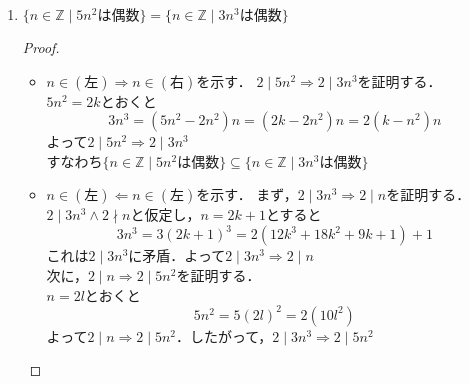 \documentclass[a4paper,12pt]{ltjsarticle}
\newcommand{\Z}{\mathbb{Z}}
\begin{document}
\begin{enumerate}[(1)]
\begin{proof}
\begin{itemize}
\begin{gather*}
                    \end{gather*}
                    両辺を$x^2$で割って
                    \begin{equation*}
                        x + \frac{1}{x} < 2
                    \end{equation*}
                    これは$x + \frac{1}{x} \geq 2$と矛盾．
            \end{itemize}
        \end{proof}
    \item $\{ n \in \Z \mid 5n^2は偶数 \} = \{ n \in \Z \mid 3n^3は偶数 \}$
        \begin{proof}
            \quad \\
            \begin{itemize}
                \item $n \in (左) \Rightarrow n \in (右)$を示す．
                    $2 \mid 5n^2 \Rightarrow 2 \mid 3n^3$を証明する． \\
                    $5n^2 = 2k$とおくと
                    \begin{equation*}
                        3n^3 = (5n^2 - 2n^2)n = (2k - 2n^2)n = 2(k - n^2)n
                    \end{equation*}
                    よって$2 \mid 5n^2 \Rightarrow 2 \mid 3n^3$ \\
                    すなわち$\{ n \in \Z \mid 5n^2は偶数 \} \subseteq \{ n \in \Z \mid 3n^3は偶数 \}$
                \item $n \in (左) \Leftarrow n \in (左)$を示す．
                    まず，$2 \mid 3n^3 \Rightarrow 2 \mid n$を証明する． \\
                    $2 \mid 3n^3 \land 2 \nmid n$と仮定し，$n = 2k + 1$とすると
                    \begin{equation*}
                        3n^3 = 3(2k + 1)^3 = 2(12k^3 + 18k^2 + 9k + 1) + 1
                    \end{equation*}
                    これは$2 \mid 3n^3$に矛盾．よって$2 \mid 3n^3 \Rightarrow 2 \mid n$ \\
                    次に，$2 \mid n \Rightarrow 2 \mid 5n^2$を証明する． \\
                    $n = 2l$とおくと
                    \begin{equation*}
                        5n^2 = 5(2l)^2 = 2(10l^2)
                    \end{equation*}
                    よって$2 \mid n \Rightarrow 2 \mid 5n^2$．したがって，$2 \mid 3n^3 \Rightarrow 2 \mid 5n^2$ \\

\end{itemize}
\end{proof}
\end{enumerate}
\end{document}
